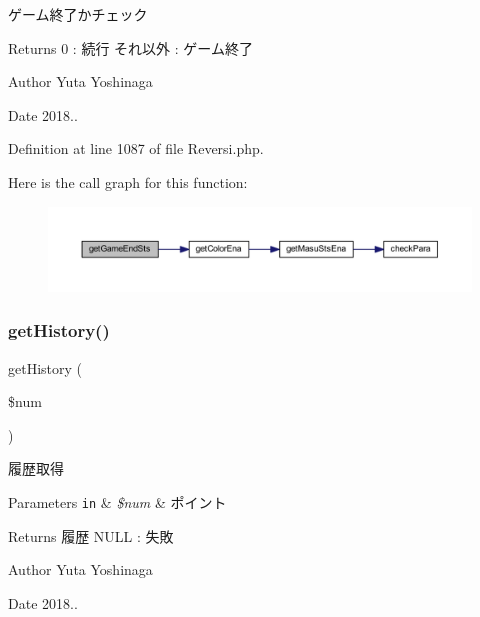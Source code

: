 ゲーム終了かチェック 

\begin{DoxyReturn}{Returns}
0 \+: 続行 それ以外 \+: ゲーム終了 
\end{DoxyReturn}
\begin{DoxyAuthor}{Author}
Yuta Yoshinaga 
\end{DoxyAuthor}
\begin{DoxyDate}{Date}
2018.. 
\end{DoxyDate}


Definition at line 1087 of file Reversi.\+php.

Here is the call graph for this function\+:
\nopagebreak
\begin{figure}[H]
\begin{center}
\leavevmode
\includegraphics[width=350pt]{class_reversi_aab9985c789e464de6cf99d7d725cb5a3_cgraph}
\end{center}
\end{figure}
\mbox{\label{class_reversi_a41cae82a798f2b3d0684bda44b837fcf}} 
\subsubsection{\texorpdfstring{get\+History()}{getHistory()}}
{\footnotesize\ttfamily get\+History (\begin{DoxyParamCaption}\item[{}]{\$num }\end{DoxyParamCaption})}



履歴取得 


\begin{DoxyParams}[1]{Parameters}
\mbox{\tt in}  & {\em \$num} & ポイント \\
\hline
\end{DoxyParams}
\begin{DoxyReturn}{Returns}
履歴 N\+U\+LL \+: 失敗 
\end{DoxyReturn}
\begin{DoxyAuthor}{Author}
Yuta Yoshinaga 
\end{DoxyAuthor}
\begin{DoxyDate}{Date}
2018.. 
\end{DoxyDate}


